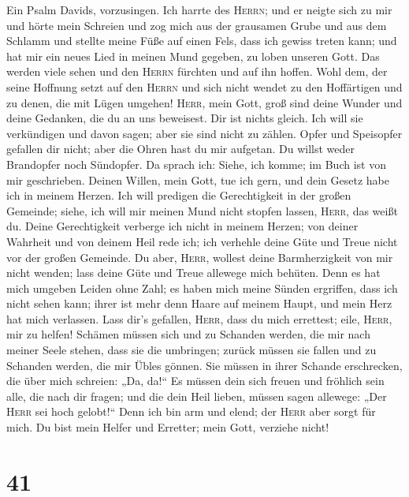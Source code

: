  Ein Psalm Davids, vorzusingen.  Ich harrte
des \textsc{Herrn}; und er neigte sich zu mir und hörte mein Schreien
 und zog mich aus der grausamen Grube und aus dem Schlamm
und stellte meine Füße auf einen Fels, dass ich gewiss treten kann;
 und hat mir ein neues Lied in meinen Mund gegeben, zu
loben unseren Gott. Das werden viele sehen und den \textsc{Herrn}
fürchten und auf ihn hoffen.  Wohl dem, der seine Hoffnung
setzt auf den \textsc{Herrn} und sich nicht wendet zu den Hoffärtigen
und zu denen, die mit Lügen umgehen!  \textsc{Herr}, mein
Gott, groß sind deine Wunder und deine Gedanken, die du an uns
beweisest. Dir ist nichts gleich. Ich will sie verkündigen und davon
sagen; aber sie sind nicht zu zählen.  Opfer und
Speisopfer gefallen dir nicht; aber die Ohren hast du mir aufgetan. Du
willst weder Brandopfer noch Sündopfer.  Da sprach ich:
Siehe, ich komme; im Buch ist von mir geschrieben.  Deinen
Willen, mein Gott, tue ich gern, und dein Gesetz habe ich in meinem
Herzen.  Ich will predigen die Gerechtigkeit in der
großen Gemeinde; siehe, ich will mir meinen Mund nicht stopfen lassen,
\textsc{Herr}, das weißt du.  Deine Gerechtigkeit
verberge ich nicht in meinem Herzen; von deiner Wahrheit und von deinem
Heil rede ich; ich verhehle deine Güte und Treue nicht vor der großen
Gemeinde.  Du aber, \textsc{Herr}, wollest deine
Barmherzigkeit von mir nicht wenden; lass deine Güte und Treue allewege
mich behüten.  Denn es hat mich umgeben Leiden ohne Zahl;
es haben mich meine Sünden ergriffen, dass ich nicht sehen kann; ihrer
ist mehr denn Haare auf meinem Haupt, und mein Herz hat mich verlassen.
 Lass dir's gefallen, \textsc{Herr}, dass du mich
errettest; eile, \textsc{Herr}, mir zu helfen!  Schämen
müssen sich und zu Schanden werden, die mir nach meiner Seele stehen,
dass sie die umbringen; zurück müssen sie fallen und zu Schanden werden,
die mir Übles gönnen.  Sie müssen in ihrer Schande
erschrecken, die über mich schreien: „Da, da!{}``  Es
müssen dein sich freuen und fröhlich sein alle, die nach dir fragen; und
die dein Heil lieben, müssen sagen allewege: „Der \textsc{Herr} sei hoch
gelobt!{}``  Denn ich bin arm und elend; der
\textsc{Herr} aber sorgt für mich. Du bist mein Helfer und Erretter;
mein Gott, verziehe nicht!

\hypertarget{section-40}{%
\section{41}\label{section-40}}

